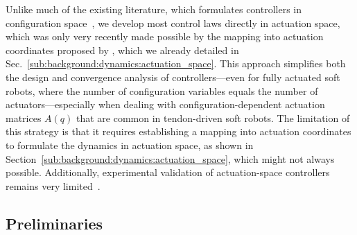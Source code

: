 Unlike much of the existing literature, which formulates controllers in configuration space~\citep{della2020model, della2023model, caasenbrood2021energy}, we develop most control laws directly in actuation space, which was only very recently made possible by the mapping into actuation coordinates proposed by \citet{pustina2024input}, which we already detailed in Sec.~\ref{sub:background:dynamics:actuation_space}. This approach simplifies both the design and convergence analysis of controllers—even for fully actuated soft robots, where the number of configuration variables equals the number of actuators—especially when dealing with configuration-dependent actuation matrices $A(q)$ that are common in tendon-driven soft robots. 
The limitation of this strategy is that it requires establishing a mapping into actuation coordinates to formulate the dynamics in actuation space, as shown in Section~\ref{sub:background:dynamics:actuation_space}, which might not always possible. Additionally, experimental validation of actuation-space controllers remains very limited~\citep{pustina2025analysis, stolzle2024experimental}.

\subsection{Preliminaries}

